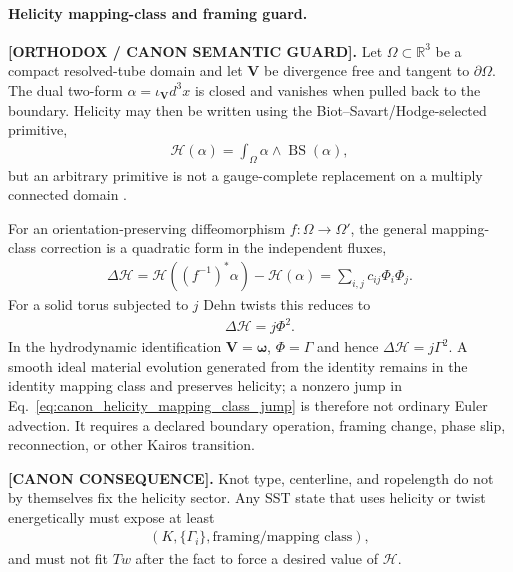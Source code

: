 \documentclass[11pt]{article}
\theoremstyle{definition}
\theoremstyle{plain}
\theoremstyle{remark}
\begin{document}
        \paragraph{Helicity mapping-class and framing guard.}
        \label{subsec:canon_helicity_mapping_class_guard}
        \textbf{[ORTHODOX / CANON SEMANTIC GUARD].}
        Let $\Omega\subset\mathbb R^3$ be a compact resolved-tube domain and let
        $\mathbf V$ be divergence free and tangent to $\partial\Omega$.  The
        dual two-form $\alpha=\iota_{\mathbf V}d^3x$ is closed and vanishes when
        pulled back to the boundary.  Helicity may then be written using the
        Biot--Savart/Hodge-selected primitive,
        \begin{align}
            \mathcal H(\alpha)
            =
            \int_{\Omega}\alpha\wedge\operatorname{BS}(\alpha),
            \label{eq:canon_helicity_bs_primitive}
        \end{align}
        but an arbitrary primitive is not a gauge-complete replacement on a
        multiply connected domain \cite{CantarellaParsley2010Helicity}.

        For an orientation-preserving diffeomorphism $f:\Omega\to\Omega'$, the
        general mapping-class correction is a quadratic form in the independent
        fluxes,
        \begin{align}
            \Delta\mathcal H
            =
            \mathcal H\!\left((f^{-1})^*\alpha\right)-\mathcal H(\alpha)
            =
            \sum_{i,j}c_{ij}\Phi_i\Phi_j .
            \label{eq:canon_helicity_mapping_class_jump}
        \end{align}
        For a solid torus subjected to $j$ Dehn twists this reduces to
        \begin{align}
            \Delta\mathcal H=j\Phi^2 .
            \label{eq:canon_helicity_dehn_twist}
        \end{align}
        In the hydrodynamic identification $\mathbf V=\boldsymbol\omega$,
        $\Phi=\Gamma$ and hence $\Delta\mathcal H=j\Gamma^2$.  A smooth ideal
        material evolution generated from the identity remains in the identity
        mapping class and preserves helicity; a nonzero jump in
        Eq.~\eqref{eq:canon_helicity_mapping_class_jump} is therefore not ordinary
        Euler advection.  It requires a declared boundary operation, framing
        change, phase slip, reconnection, or other Kairos transition.

        \textbf{[CANON CONSEQUENCE].}
        Knot type, centerline, and ropelength do not by themselves fix the
        helicity sector.  Any SST state that uses helicity or twist energetically
        must expose at least
        \begin{align}
            \left(K,\{\Gamma_i\},\text{framing/mapping class}\right),
            \label{eq:canon_helicity_state_metadata}
        \end{align}
        and must not fit $Tw$ after the fact to force a desired value of
        $\mathcal H$.
\end{document}

